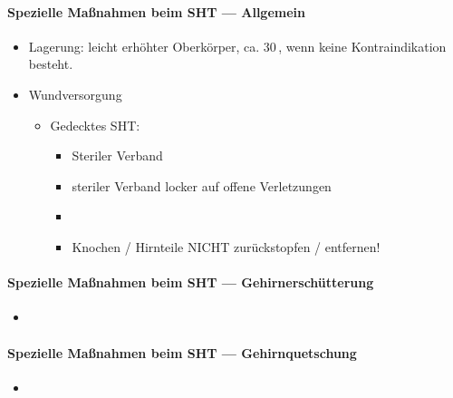 \begin{gMassnahmenEnv}
    \paragraph{Spezielle Maßnahmen beim SHT --- Allgemein}
    
    \begin{itemize}
        \item Lagerung: leicht erhöhter Oberkörper, ca.
        30\,\textdegree , wenn keine Kontraindikation
        besteht.
        \item Wundversorgung
        \begin{itemize}
            \item Gedecktes SHT:
            \begin{itemize}
                \item Steriler Verband
            \end{itemize}
            \begin{itemize}
                \item steriler Verband locker auf offene
                Verletzungen
                \item \item Knochen / Hirnteile NICHT 
                zur\"uckstopfen /  entfernen!
            \end{itemize}
        \end{itemize}
    \end{itemize}
\end{gMassnahmenEnv}

\begin{gMassnahmenEnv}
    \paragraph{Spezielle Maßnahmen beim SHT ---
    Gehirnerschütterung}
    \begin{itemize}
        \item 
    \end{itemize}
\end{gMassnahmenEnv}

\begin{gMassnahmenEnv}
    \paragraph{Spezielle Maßnahmen beim SHT ---
    Gehirnquetschung}
    \begin{itemize}
        \item 
    \end{itemize}
\end{gMassnahmenEnv}

